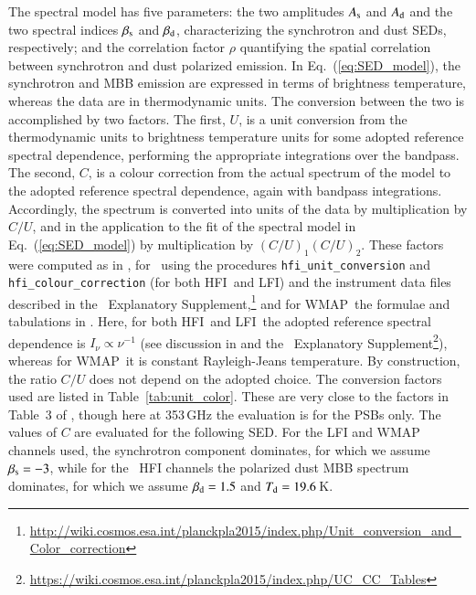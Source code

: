 \documentclass[longauth,traditabstract]{aa}
\def\wmap{\WMAP}
\newcommand{\WMAP}{WMAP}
\newcommand{\HFI}{HFI}
\newcommand{\LFI}{LFI}
\begin{document}
The spectral model has five parameters: the two amplitudes $A_{\rm s}$ and $A_{\rm d}$ and the two spectral indices $\beta_{\rm s}$ and $\beta_{\rm d}$, characterizing the synchrotron and dust 
SEDs, respectively; and the correlation factor $\rho$ quantifying the spatial correlation between synchrotron and dust polarized emission.
%
In Eq.~(\ref{eq:SED_model}), the  synchrotron and MBB emission are expressed in terms of brightness temperature, whereas the data are in thermodynamic units.  The conversion between the two is accomplished by two factors.  The first, $U$, is a unit conversion from the thermodynamic units to brightness temperature units for some adopted reference spectral dependence, performing the appropriate integrations over the bandpass.  The second, $C$, is a colour correction from the actual spectrum of the model to the adopted reference spectral dependence, again with bandpass integrations.  Accordingly, the spectrum is converted into units of the data by multiplication by $C/U$, and in the application to the fit of the spectral model in Eq.~(\ref{eq:SED_model}) by multiplication by $(C/U)_1 (C/U)_2$.
%
These factors were computed as in \citet{planck2014-XXII}, for \Planck\ using the procedures  
{\tt hfi\_unit\_conversion} and {\tt hfi\_colour\_correction} (for both \HFI\ and \LFI) and the instrument data files described in the \Planck\ Explanatory 
Supplement,\footnote{\url{http://wiki.cosmos.esa.int/planckpla2015/index.php/Unit\_conversion\_and\_Color\_correction}} and for \wmap\ the formulae and tabulations in \citet{Jarosik03}.  Here, 
for both \HFI\ and \LFI\ the adopted reference spectral dependence is $I_\nu \propto \nu^{-1}$ (see discussion in \citealp{planck2013-p03d} 
and the \Planck\ Explanatory Supplement\footnote{\url{https://wiki.cosmos.esa.int/planckpla2015/index.php/UC_CC_Tables}}),
whereas for \wmap\ it is constant Rayleigh-Jeans temperature.  By construction, the ratio $C/U$ does not depend on the adopted choice.
The conversion factors used are listed in Table~\ref{tab:unit_color}.  These are very close to the factors  in Table~3 of \citet{planck2014-XXII}, though here at 353\,GHz the evaluation is for the PSBs only.
The values of $C$ are evaluated for the following SED.  For the LFI and WMAP channels used, the synchrotron component dominates, for which we assume
$\beta_{\rm s} = -3$, while for the \Planck\ HFI channels the polarized dust MBB spectrum dominates, for which we assume $\beta_{\rm d} = 1.5$ and $T_{\rm d} = 19.6$\,K.  
\end{document}
